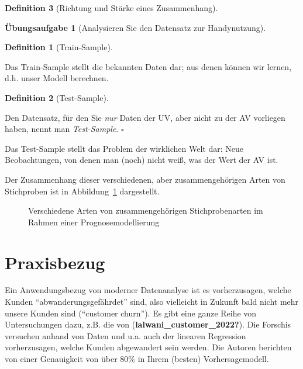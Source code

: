 \documentclass[
  a4paper,
  DIV=11]{scrreprt}
\theoremstyle{definition}
\newtheorem{exercise}{Übungsaufgabe}[chapter]
\theoremstyle{definition}
\theoremstyle{definition}
\newtheorem{definition}{Definition}[chapter]
\theoremstyle{remark}
\begin{document}
\begin{definition}[Richtung und Stärke eines
Zusammenhang]
\begin{exercise}[Analysieren Sie den Datensatz zur
Handynutzung]
\begin{definition}[Train-Sample]
\end{definition}

Das Train-Sample stellt die bekannten Daten dar; aus denen können wir
lernen, d.h. unser Modell berechnen.

\begin{definition}[Test-Sample]\protect\hypertarget{def-testsample}{}\label{def-testsample}

Den Datensatz, für den Sie \emph{nur} Daten der UV, aber nicht zu der AV
vorliegen haben, nennt man \emph{Test-Sample}. \(\square\)

\end{definition}

Das Test-Sample stellt das Problem der wirklichen Welt dar: Neue
Beobachtungen, von denen man (noch) nicht weiß, was der Wert der AV ist.

Der Zusammenhang dieser verschiedenen, aber zusammengehörigen Arten von
Stichproben ist in Abbildung~\ref{fig-sample-types} dargestellt.

\begin{figure}


\caption{\label{fig-sample-types}Verschiedene Arten von
zusammengehörigen Stichprobenarten im Rahmen einer Prognosemodellierung}

\end{figure}%

\section{Praxisbezug}\label{praxisbezug-4}

Ein Anwendungsbezug von moderner Datenanalyse ist es vorherzusagen,
welche Kunden ``abwanderungsgefährdet'' sind, also vielleicht in Zukunft
bald nicht mehr unsere Kunden sind (``customer churn''). Es gibt eine
ganze Reihe von Untersuchungen dazu, z.B. die von
(\textbf{lalwani\_customer\_2022?}). Die Forschis versuchen anhand von
Daten und u.a. auch der linearen Regression vorherzusagen, welche Kunden
abgewandert sein werden. Die Autoren berichten von einer Genauigkeit von
über 80\% in Ihrem (besten) Vorhersagemodell.


\end{exercise}
\end{definition}
\end{document}
